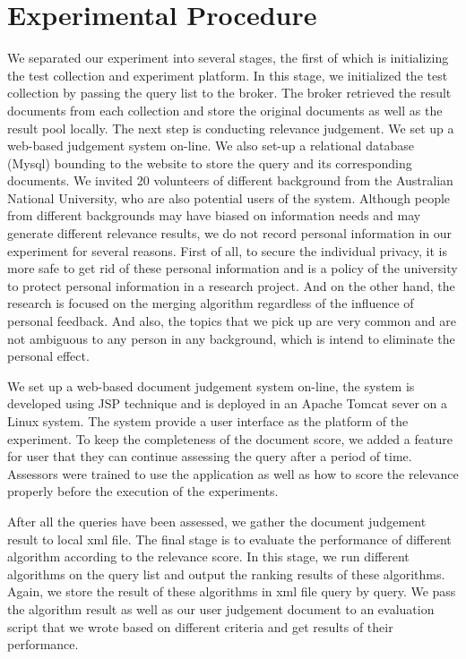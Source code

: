 \section{Experimental Procedure}
We separated our experiment into several stages, the first of which is initializing the test collection and experiment platform. In this stage, we initialized the test collection by passing the query list to the broker. The broker retrieved the result documents from each collection and store the original documents as well as the result pool locally. The next step is conducting relevance judgement. We set up a web-based judgement system on-line. We also set-up a relational database (Mysql) bounding to the website to store the query and its corresponding documents. We invited 20 volunteers of different background from the Australian National University, who are also potential users of the system. Although people from different backgrounds may have biased on information needs and may generate different relevance results, we do not record personal information in our experiment for several reasons. First of all, to secure the individual privacy, it is more safe to get rid of these personal information and is a policy of the university to protect personal information in a research project. And on the other hand, the research is focused on the merging algorithm regardless of the influence of personal feedback. And also, the topics that we pick up are very common and are not ambiguous to any person in any background, which is intend to eliminate the personal effect. 

We set up a web-based document judgement system on-line, the system is developed using JSP technique and is deployed in an Apache Tomcat sever on a Linux system. The system provide a user interface as the platform of the experiment. To keep the completeness of the document score, we added a feature for user that they can continue assessing the query after a period of time. Assessors were trained to use the application as well as how to score the relevance properly before the execution of the experiments. 

After all the queries have been assessed, we gather the document judgement result to local xml file. The final stage is to evaluate the performance of different algorithm according to the relevance score. In this stage, we run different algorithms on the query list and output the ranking results of these algorithms. Again, we store the result of these algorithms in xml file query by query. We pass the algorithm result as well as our user judgement document to an evaluation script that we wrote based on different criteria and get results of their performance.


